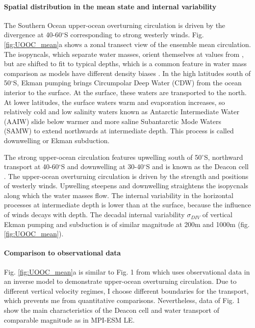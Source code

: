 \documentclass[12pt]{article}
\begin{document}
\paragraph{Spatial distribution in the mean state and internal variability}
The Southern Ocean upper-ocean overturning circulation is driven by the divergence at 40-60$^\circ$S corresponding to strong westerly winds. Fig. \ref{fig:UOOC_mean}a shows a zonal transect view of the ensemble mean circulation. 
The isopyncals, which separate water masses, orient themselves at values from \cite{Sallee2013a}, but are shifted to fit to typical depths, which is a common feature in water mass comparison as models have different density biases \citep{Sallee2013a}. 
In the high latitudes south of 50$^\circ$S, Ekman pumping brings Circumpolar Deep Water (CDW) from the ocean interior to the surface. At the surface, these waters are transported to the north. At lower latitudes, the surface waters warm and evaporation increases, so relatively cold and low salinity waters known as Antarctic Intermediate Water (AAIW) slide below warmer and more saline Subantarctic Mode Waters (SAMW) to extend northwards at intermediate depth. This process is called downwelling or Ekman subduction.  

The strong upper-ocean circulation features upwelling south of 50$^\circ$S, northward transport at 40-60$^\circ$S and downwelling at 30-40$^\circ$S and is known as the Deacon cell \citep{Doeoes1993,Speer2000}. The upper-ocean overturning circulation is driven by the strength and positions of westerly winds. Upwelling steepens and downwelling straightens the isopycnals along which the water masses flow. The internal variability in the horizontal processes at intermediate depth is lower than at the surface, because the influence of winds decays with depth. The decadal internal variability $\sigma_{DIV}$ of vertical Ekman pumping and subduction is of similar magnitude at 200m and 1000m (fig. \ref{fig:UOOC_mean}). 

\paragraph{Comparison to observational data}
Fig. \ref{fig:UOOC_mean}a is similar to Fig. 1 from \cite{DeVries2017} which uses observational data in an inverse model to demonstrate upper-ocean overturning circulation. Due to different vertical velocity regimes, I choose different boundaries for the transport, which prevents me from quantitative comparisons. Nevertheless, data of \cite{DeVries2017} Fig. 1 show the main characteristics of the Deacon cell and water transport of comparable magnitude as in MPI-ESM LE. 
\end{document}
